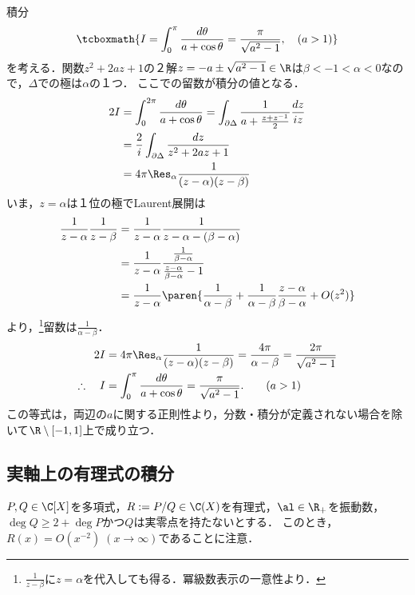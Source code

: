 \documentclass[uplatex, dvipdfmx]{jsreport}
\begin{document}
\begin{example}
    積分
    \[\tcboxmath{I=\int^\pi_0\frac{d\theta}{a+\cos\theta}=\frac{\pi}{\sqrt{a^2-1}},\quad(a>1)}\]
    を考える．関数$z^2+2az+1$の２解$z=-a\pm\sqrt{a^2-1}\in\R$は$\beta<-1<\alpha<0$なので，$\Delta$での極は$\alpha$の１つ．
    ここでの留数が積分の値となる．
    \begin{align*}
        2I&=\int^{2\pi}_0\frac{d\theta}{a+\cos\theta}=\int_{\partial\Delta}\frac{1}{a+\frac{z+z^{-1}}{2}}\frac{dz}{iz}\\
        &=\frac{2}{i}\int_{\partial\Delta}\frac{dz}{z^2+2az+1}\\
        &=4\pi\Res_\alpha\frac{1}{(z-\alpha)(z-\beta)}
    \end{align*}
    いま，$z=\alpha$は１位の極でLaurent展開は
    \begin{align*}
        \frac{1}{z-\alpha}\frac{1}{z-\beta}&=
        \frac{1}{z-\alpha}\frac{1}{z-\alpha-(\beta-\alpha)}\\
        &=\frac{1}{z-\alpha}\frac{\frac{1}{\beta-\alpha}}{\frac{z-\alpha}{\beta-\alpha}-1}\\
        &=\frac{1}{z-\alpha}\paren{\frac{1}{\alpha-\beta}+\frac{1}{\alpha-\beta}\frac{z-\alpha}{\beta-\alpha}+O(z^2)}
    \end{align*}
    より，\footnote{$\frac{1}{z-\beta}$に$z=\alpha$を代入しても得る．冪級数表示の一意性より．}留数は$\frac{1}{\alpha-\beta}$．
    \begin{align*}
        2I&=4\pi\Res_\alpha\frac{1}{(z-\alpha)(z-\beta)}=\frac{4\pi}{\alpha-\beta}=\frac{2\pi}{\sqrt{a^2-1}}\\
        \therefore\quad I&=\int^\pi_0\frac{d\theta}{a+\cos\theta}=\frac{\pi}{\sqrt{a^2-1}}.\qquad(a>1)
    \end{align*}
    この等式は，両辺の$a$に関する正則性より，分数・積分が定義されない場合を除いて$\R\setminus[-1,1]$上で成り立つ．
\end{example}

\subsection{実軸上の有理式の積分}

\begin{notation}
    $P,Q\in\C[X]$を多項式，$R:=P/Q\in\C(X)$を有理式，$\al\in\R_+$を振動数，$\deg Q\ge 2+\deg P$かつ$Q$は実零点を持たないとする．
    このとき，$R(x)=O(x^{-2})\;(x\to\infty)$であることに注意．
\end{notation}
\end{document}
